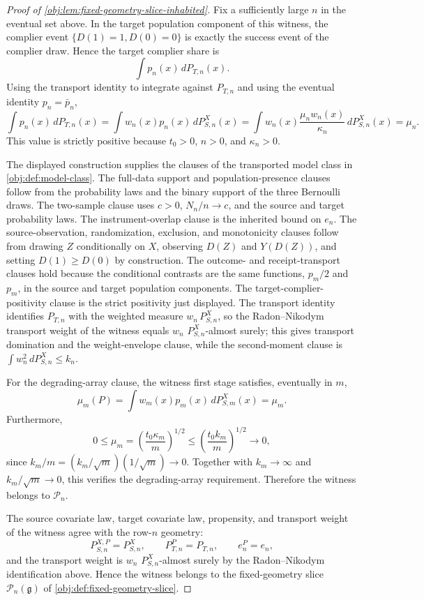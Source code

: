 \documentclass[11pt]{article}
\begin{document}
\begin{proof}[Proof of \cref{obj:lem:fixed-geometry-slice-inhabited}]
Fix a sufficiently large \(n\) in the eventual set above. In the target population component of this witness, the complier event \(\{D(1)=1,D(0)=0\}\) is exactly the success event of the complier draw. Hence the target complier share is
\[
\int p_n(x)\,dP_{T,n}(x).
\]
Using the transport identity to integrate against \(P_{T,n}\) and using the eventual identity \(p_n=\bar p_n\),
\[
\int p_n(x)\,dP_{T,n}(x)
=
\int w_n(x)p_n(x)\,dP_{S,n}^X(x)
=
\int w_n(x)\frac{\mu_n w_n(x)}{\kappa_n}\,dP_{S,n}^X(x)
=
\mu_n.
\]
This value is strictly positive because \(t_0>0\), \(n>0\), and \(\kappa_n>0\). %

The displayed construction supplies the clauses of the transported model class in \cref{obj:def:model-class}. The full-data support and population-presence clauses follow from the probability laws and the binary support of the three Bernoulli draws. The two-sample clause uses \(c>0\), \(N_n/n\to c\), and the source and target probability laws. The instrument-overlap clause is the inherited bound on \(e_n\). The source-observation, randomization, exclusion, and monotonicity clauses follow from drawing \(Z\) conditionally on \(X\), observing \(D(Z)\) and \(Y(D(Z))\), and setting \(D(1)\ge D(0)\) by construction. The outcome- and receipt-transport clauses hold because the conditional contrasts are the same functions, \(p_m/2\) and \(p_m\), in the source and target population components. The target-complier-positivity clause is the strict positivity just displayed. The transport identity identifies \(P_{T,n}\) with the weighted measure \(w_n\,P_{S,n}^X\), so the Radon--Nikodym transport weight of the witness equals \(w_n\) \(P_{S,n}^X\)-almost surely; this gives transport domination and the weight-envelope clause, while the second-moment clause is \(\int w_n^2\,dP_{S,n}^X\le k_n\).

For the degrading-array clause, the witness first stage satisfies, eventually in \(m\),
\[
\mu_m(P)
=
\int w_m(x)p_m(x)\,dP_{S,m}^X(x)
=
\mu_m.
\]
Furthermore,
\[
0\le \mu_m
=\left(\frac{t_0\kappa_m}{m}\right)^{1/2}
\le
\left(\frac{t_0 k_m}{m}\right)^{1/2}
\longrightarrow0,
\]
since \(k_m/m=(k_m/\sqrt m)(1/\sqrt m)\to0\). Together with \(k_m\to\infty\) and \(k_m/\sqrt m\to0\), this verifies the degrading-array requirement. Therefore the witness belongs to \(\mathcal P_n\). %

The source covariate law, target covariate law, propensity, and transport weight of the witness agree with the row-\(n\) geometry:
\[
P_{S,n}^{X,P}=P_{S,n}^X,
\qquad
P_{T,n}^{P}=P_{T,n},
\qquad
e_n^P=e_n,
\]
and the transport weight is \(w_n\) \(P_{S,n}^X\)-almost surely by the Radon--Nikodym identification above. Hence the witness belongs to the fixed-geometry slice \(\mathcal P_n(\mathfrak g)\) of \cref{obj:def:fixed-geometry-slice}. %


\end{proof}
\end{document}
